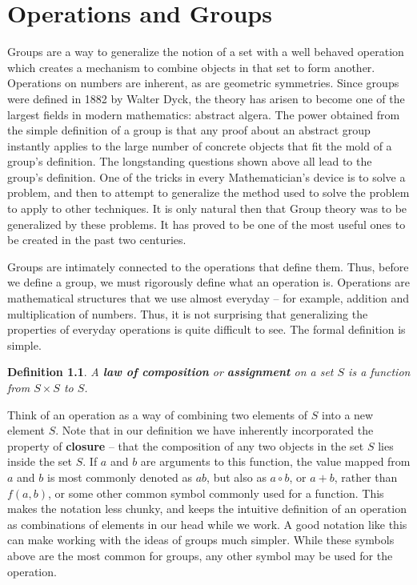\documentclass[12pt]{report}
\newtheorem{definition}{Definition}
\begin{document}
\chapter{Operations and Groups}

Groups are a way to generalize the notion of a set with a well behaved operation which creates a mechanism to combine objects in that set to form another. Operations on numbers are inherent, as are geometric symmetries. Since groups were defined in 1882 by Walter Dyck, the theory has arisen to become one of the largest fields in modern mathematics: abstract algera. The power obtained from the simple definition of a group is that any proof about an abstract group instantly applies to the large number of concrete objects that fit the mold of a group's definition. The longstanding questions shown above all lead to the group's definition. One of the tricks in every Mathematician's device is to solve a problem, and then to attempt to generalize the method used to solve the problem to apply to other techniques. It is only natural then that Group theory was to be generalized by these problems. It has proved to be one of the most useful ones to be created in the past two centuries.

Groups are intimately connected to the operations that define them. Thus, before we define a group, we must rigorously define what an operation is. Operations are mathematical structures that we use almost everyday -- for example, addition and multiplication of numbers. Thus, it is not surprising that generalizing the properties of everyday operations is quite difficult to see. The formal definition is simple.

\begin{definition}
    A {\bf law of composition} or {\bf assignment} on a set $S$ is a function from $S \times S$ to $S$.
\end{definition}

Think of an operation as a way of combining two elements of $S$ into a new element $S$. Note that in our definition we have inherently incorporated the property of {\bf closure} -- that the composition of any two objects in the set $S$ lies inside the set $S$. If $a$ and $b$ are arguments to this function, the value mapped from $a$ and $b$ is most commonly denoted as $ab$, but also as $a \circ b$, or $a + b$, rather than $f(a,b)$, or some other common symbol commonly used for a function. This makes the notation less chunky, and keeps the intuitive definition of an operation as combinations of elements in our head while we work. A good notation like this can make working with the ideas of groups much simpler. While these symbols above are the most common for groups, any other symbol may be used for the operation. 
\end{document}
